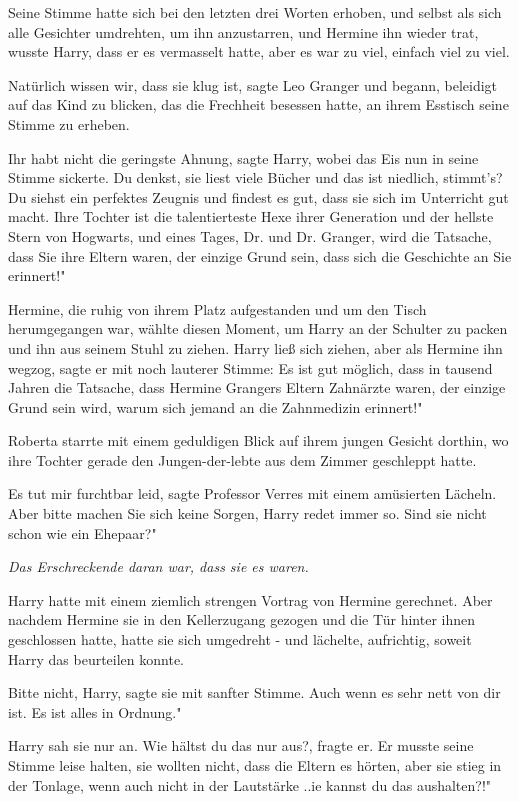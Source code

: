 Seine Stimme hatte sich bei den letzten drei Worten erhoben, und selbst als sich
alle Gesichter umdrehten, um ihn anzustarren, und Hermine ihn wieder trat,
wusste Harry, dass er es vermasselt hatte, aber es war zu viel, einfach viel zu
viel.

\glqq Natürlich wissen wir, dass sie klug ist\grqq{}, sagte Leo Granger und
begann, beleidigt auf das Kind zu blicken, das die Frechheit besessen hatte, an
ihrem Esstisch seine Stimme zu erheben.

\glqq Ihr habt nicht die geringste Ahnung\grqq{}, sagte Harry, wobei das Eis nun
in seine Stimme sickerte. \glqq Du denkst, sie liest viele Bücher und das ist
niedlich, stimmt's? Du siehst ein perfektes Zeugnis und findest es gut, dass sie
sich im Unterricht gut macht. Ihre Tochter ist die talentierteste Hexe ihrer
Generation und der hellste Stern von Hogwarts, und eines Tages, Dr. und Dr.
Granger, wird die Tatsache, dass Sie ihre Eltern waren, der einzige Grund sein,
dass sich die Geschichte an Sie erinnert!"

Hermine, die ruhig von ihrem Platz aufgestanden und um den Tisch herumgegangen
war, wählte diesen Moment, um Harry an der Schulter zu packen und ihn aus seinem
Stuhl zu ziehen. Harry ließ sich ziehen, aber als Hermine ihn wegzog, sagte er
mit noch lauterer Stimme: \glqq Es ist gut möglich, dass in tausend Jahren die
Tatsache, dass Hermine Grangers Eltern Zahnärzte waren, der einzige Grund sein
wird, warum sich jemand an die Zahnmedizin erinnert!"

Roberta starrte mit einem geduldigen Blick auf ihrem jungen Gesicht dorthin, wo
ihre Tochter gerade den Jungen-der-lebte aus dem Zimmer geschleppt hatte.

\glqq Es tut mir furchtbar leid\grqq{}, sagte Professor Verres mit einem
amüsierten Lächeln. \glqq Aber bitte machen Sie sich keine Sorgen, Harry redet
immer so. Sind sie nicht schon wie ein Ehepaar?"

\emph{ Das Erschreckende daran war, dass sie es waren. }

Harry hatte mit einem ziemlich strengen Vortrag von Hermine gerechnet. Aber
nachdem Hermine sie in den Kellerzugang gezogen und die Tür hinter ihnen
geschlossen hatte, hatte sie sich umgedreht - und lächelte, aufrichtig, soweit
Harry das beurteilen konnte.

\glqq Bitte nicht, Harry\grqq{}, sagte sie mit sanfter Stimme. \glqq Auch wenn
es sehr nett von dir ist. Es ist alles in Ordnung."

Harry sah sie nur an. \glqq Wie hältst du das nur aus?\grqq{}, fragte er. Er
musste seine Stimme leise halten, sie wollten nicht, dass die Eltern es hörten,
aber sie stieg in der Tonlage, wenn auch nicht in der Lautstärke .\grqq{}.ie
kannst du das aushalten?!"

